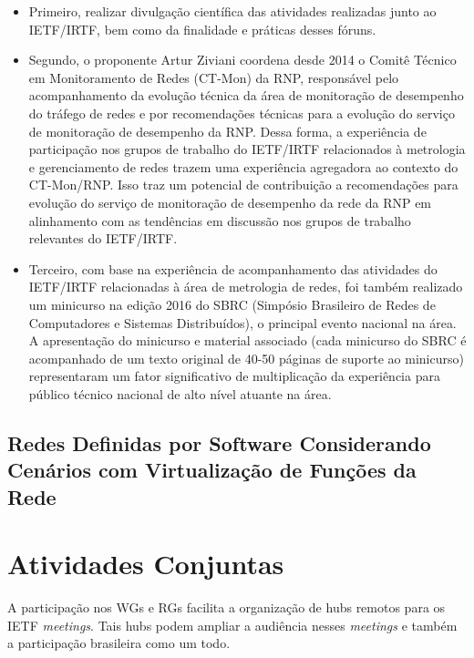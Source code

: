 \documentclass[12pt]{article}
\begin{document}
\begin{itemize}
\item Primeiro, realizar divulgação científica das atividades realizadas junto ao IETF/IRTF, bem como da finalidade e práticas desses fóruns.

\item Segundo, o proponente Artur Ziviani coordena desde 2014 o Comitê Técnico em Monitoramento de Redes (CT-Mon) da RNP, responsável pelo acompanhamento da evolução técnica da área de monitoração de desempenho do tráfego de redes e por recomendações técnicas para a evolução do serviço de monitoração de desempenho da RNP. Dessa forma, a experiência de participação nos grupos de trabalho do IETF/IRTF relacionados à metrologia e gerenciamento de redes trazem uma experiência agregadora ao contexto do CT-Mon/RNP. Isso traz um potencial de contribuição a recomendações para evolução do serviço de monitoração de desempenho da rede da RNP em alinhamento com as tendências em discussão nos grupos de trabalho relevantes do IETF/IRTF.

\item Terceiro, com base na experiência de acompanhamento das atividades do IETF/IRTF relacionadas à área de metrologia de redes, foi também realizado um minicurso na edição 2016 do SBRC (Simpósio Brasileiro de Redes de Computadores e Sistemas Distribuídos), o principal evento nacional na área. A apresentação do minicurso e material associado (cada minicurso do SBRC é acompanhado de um texto original de 40-50 páginas de suporte ao minicurso) representaram um fator significativo de multiplicação da experiência para público técnico nacional de alto nível atuante na área.

\end{itemize}


\subsection{Redes Definidas por Software Considerando Cenários com Virtualização de Funções da Rede}

\section{Atividades Conjuntas}




A participação nos WGs e RGs facilita a organização de hubs remotos para os IETF \textit{meetings}. Tais hubs podem ampliar a audiência nesses \textit{meetings} e também a participação brasileira como um todo.
\end{document}
